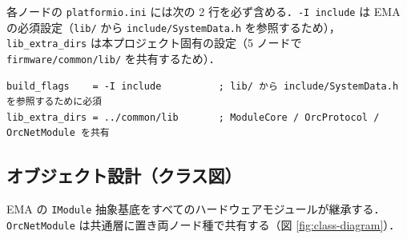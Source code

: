 \documentclass[lualatex,book,paper=a4paper,jafontsize=11.5pt,jafontscale=1.05]{jlreq}
\begin{document}
各ノードの \texttt{platformio.ini} には次の 2 行を必ず含める．\texttt{-I include}
は EMA の必須設定（\texttt{lib/} から \texttt{include/SystemData.h} を参照するため），
\texttt{lib\_extra\_dirs} は本プロジェクト固有の設定（5 ノードで \texttt{firmware/common/lib/}
を共有するため）．

\begin{tcolorbox}[colback=codebg,colframe=accentblue,boxrule=0.5pt,arc=2pt,breakable,
  left=4pt,right=4pt,top=8pt,bottom=4pt,
  title={platformio.ini 共通部の必須設定},
  fonttitle=\bfseries\small,coltitle=white,
  attach boxed title to top left={xshift=4mm,yshift*=-2mm},
  boxed title style={colback=accentblue,colframe=accentblue,sharp corners=northwest}]
\begin{Verbatim}[fontsize=\footnotesize,xleftmargin=2pt]
build_flags    = -I include          ; lib/ から include/SystemData.h を参照するために必須
lib_extra_dirs = ../common/lib       ; ModuleCore / OrcProtocol / OrcNetModule を共有
\end{Verbatim}
\end{tcolorbox}

\subsection{オブジェクト設計（クラス図）}\label{subsec:class-design}

EMA の \texttt{IModule} 抽象基底をすべてのハードウェアモジュールが継承する．
\texttt{OrcNetModule} は共通層に置き両ノード種で共有する（図 \ref{fig:class-diagram}）．
\end{document}
